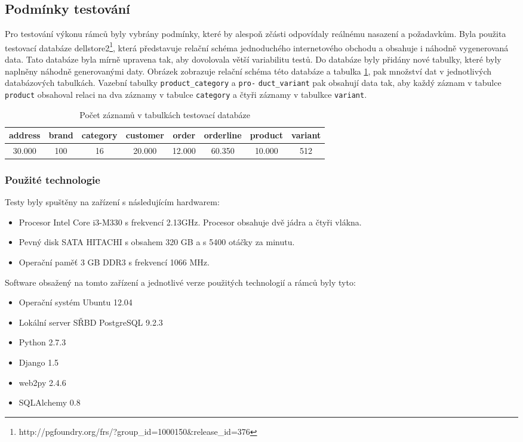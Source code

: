\documentclass[ing,male,java,dept456]{diploma}						%
\begin{document}
\subsection{Podmínky testování}
Pro testování výkonu rámců byly vybrány podmínky, které by alespoň zčásti odpovídaly reálnému nasazení a požadavkům. 
Byla použita testovací databáze dellstore2\footnote{http://pgfoundry.org/frs/?group\_id=1000150\&release\_id=376}, která představuje relační schéma jednoduchého internetového obchodu a obsahuje i náhodně vygenerovaná data. Tato databáze byla mírně upravena tak, aby dovolovala větší variabilitu testů. Do databáze byly přidány nové tabulky, které byly naplněny náhodně generovanými daty. Obrázek zobrazuje relační schéma této databáze a tabulka \ref{tab:TestRecords}, pak množství dat v jednotlivých databázových tabulkách. Vazební tabulky \lstinline[style=inlinepython]|product_category| a \lstinline[style=inlinepython]|pro-| \lstinline[style=inlinepython]|duct_variant| pak obsahují data tak, aby každý záznam v tabulce \lstinline[style=inlinepython]|product| obsahoval relaci na dva záznamy v tabulce \lstinline[style=inlinepython]|category| a čtyři záznamy v tabulkce \lstinline[style=inlinepython]|variant|.

\begin{table}
  \centering
  \begin{tabular}{|c|c|c|c|c|c|c|c|}
    \hline
    address & brand & category & customer & order & orderline & product & variant \\
    \hline
	30.000 & 100 & 16 & 20.000 & 12.000 & 60.350 & 10.000 &  512 \\
	\hline
  \end{tabular}
  \caption{Počet záznamů v tabulkách testovací databáze}
  \label{tab:TestRecords}
\end{table}

\subsubsection{Použité technologie}
Testy byly spuštěny na zařízení s následujícím hardwarem:
\begin{itemize}
\item Procesor Intel Core i3-M330 s frekvencí 2.13GHz. Procesor obsahuje dvě jádra a čtyři vlákna.
\item Pevný disk SATA HITACHI s obsahem 320 GB a s 5400 otáčky za minutu.
\item Operační paměť 3 GB DDR3 s frekvencí 1066 MHz.
\end{itemize}
Software obsažený na tomto zařízení a jednotlivé verze použitých technologií a rámců byly tyto:
\begin{itemize}
\item Operační systém Ubuntu 12.04
\item Lokální server SŘBD PostgreSQL 9.2.3
\item Python 2.7.3
\item Django 1.5
\item web2py 2.4.6
\item SQLAlchemy 0.8
\end{itemize}
\end{document}
